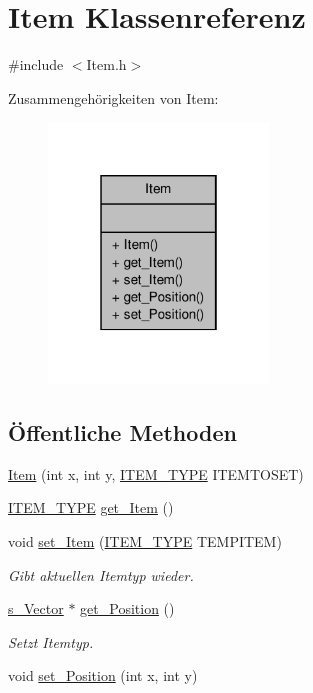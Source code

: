 \hypertarget{class_item}{\section{Item Klassenreferenz}
\label{class_item}
}


{\ttfamily \#include $<$Item.\-h$>$}



Zusammengehörigkeiten von Item\-:
\nopagebreak
\begin{figure}[H]
\begin{center}
\leavevmode
\includegraphics[width=166pt]{class_item__coll__graph}
\end{center}
\end{figure}
\subsection*{Öffentliche Methoden}
\begin{DoxyCompactItemize}
\item 
\hyperlink{class_item_ae203ad5350de1aa73defd90973e055f0}{Item} (int x, int y, \hyperlink{globals_8h_a025279585f93967b0c7184f5b8597490}{I\-T\-E\-M\-\_\-\-T\-Y\-P\-E} I\-T\-E\-M\-T\-O\-S\-E\-T)
\item 
\hyperlink{globals_8h_a025279585f93967b0c7184f5b8597490}{I\-T\-E\-M\-\_\-\-T\-Y\-P\-E} \hyperlink{class_item_afcee83c2911215a53019b9182a37eb9f}{get\-\_\-\-Item} ()
\item 
void \hyperlink{class_item_a00a562954be3b3ce018676aea84d9a75}{set\-\_\-\-Item} (\hyperlink{globals_8h_a025279585f93967b0c7184f5b8597490}{I\-T\-E\-M\-\_\-\-T\-Y\-P\-E} T\-E\-M\-P\-I\-T\-E\-M)
\begin{DoxyCompactList}\small\item\em Gibt aktuellen Itemtyp wieder. \end{DoxyCompactList}\item 
\hyperlink{structs___vector}{s\-\_\-\-Vector} $\ast$ \hyperlink{class_item_a8fbd971dcad6d5bffb887657db6f1a68}{get\-\_\-\-Position} ()
\begin{DoxyCompactList}\small\item\em Setzt Itemtyp. \end{DoxyCompactList}\item 
void \hyperlink{class_item_a71772937c1e153dbef03e583be74215a}{set\-\_\-\-Position} (int x, int y)
\end{DoxyCompactItemize}


